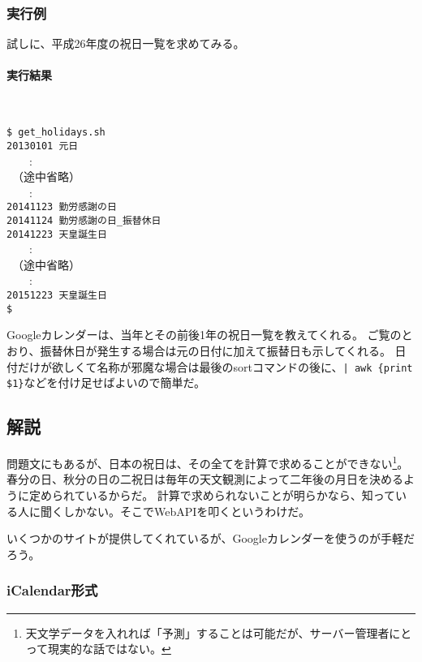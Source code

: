 \subsubsection*{実行例}

試しに、平成26年度の祝日一覧を求めてみる。

\paragraph{実行結果} 　
\begin{screen}
	\verb|$ get_holidays.sh| \return \\
	\verb|20130101 元日| \\
	　　: \\
	　（途中省略） \\
	　　: \\
	\verb|20141123 勤労感謝の日| \\
	\verb|20141124 勤労感謝の日_振替休日| \\
	\verb|20141223 天皇誕生日| \\
	　　: \\
	　（途中省略） \\
	　　: \\
	\verb|20151223 天皇誕生日| \\
	\verb|$ |
\end{screen}

Googleカレンダーは、当年とその前後1年の祝日一覧を教えてくれる。
ご覧のとおり、振替休日が発生する場合は元の日付に加えて振替日も示してくれる。
日付だけが欲しくて名称が邪魔な場合は最後のsortコマンドの後に、\verb!| awk {print $1}!などを付け足せばよいので簡単だ。

\subsection*{解説}

問題文にもあるが、日本の祝日は、その全てを計算で求めることができない\footnote{天文学データを入れれば「予測」することは可能だが、サーバー管理者にとって現実的な話ではない。}。
春分の日、秋分の日の二祝日は毎年の天文観測によって二年後の月日を決めるように定められているからだ。
計算で求められないことが明らかなら、知っている人に聞くしかない。そこでWebAPIを叩くというわけだ。

いくつかのサイトが提供してくれているが、Googleカレンダーを使うのが手軽だろう。

\subsubsection*{iCalendar形式}

